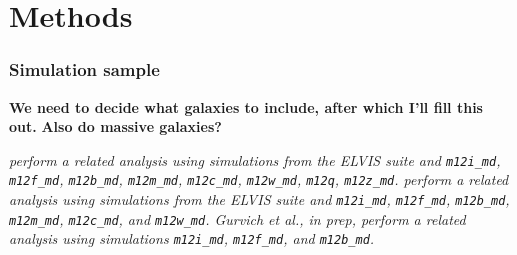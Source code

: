 \documentclass[fleqn,usenatbib]{mnras}
\begin{document}





\section{Methods}
\label{s: methods}

\subsubsection{Simulation sample}
\label{s: methods -- simulations}

\textbf{We need to decide what galaxies to include, after which I'll fill this out.}
\textbf{Also do massive galaxies?}

\textit{
\cite{Garrison-Kimmel2018} perform a related analysis using simulations from the ELVIS suite and \texttt{m12i\_md}, \texttt{m12f\_md}, \texttt{m12b\_md}, \texttt{m12m\_md}, \texttt{m12c\_md}, \texttt{m12w\_md}, \texttt{m12q}, \texttt{m12z\_md}.
\cite{Yu2021} perform a related analysis using simulations from the ELVIS suite and \texttt{m12i\_md}, \texttt{m12f\_md}, \texttt{m12b\_md}, \texttt{m12m\_md}, \texttt{m12c\_md}, and \texttt{m12w\_md}.
Gurvich et al., in prep, perform a related analysis using simulations \texttt{m12i\_md}, \texttt{m12f\_md}, and \texttt{m12b\_md}.
}
\end{document}
